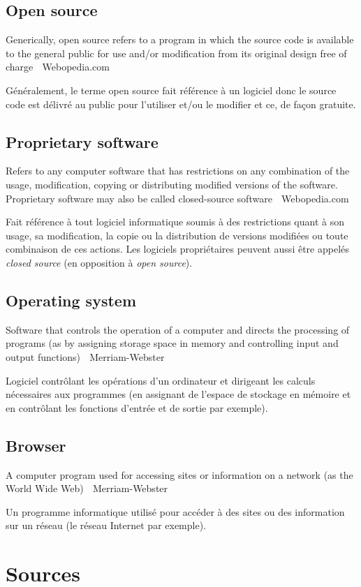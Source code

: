 \documentclass[12pt]{article}
\begin{document}
\subsection*{Open source}

{\color{bg}Generically, open source refers to a program in which the
  source code is available to the general public for use and/or
  modification from its original design free of charge \textemdash
  $\;$ Webopedia.com }

Généralement, le terme open source fait référence à un logiciel donc
le source code est délivré au public pour l'utiliser et/ou le modifier
et ce, de façon gratuite.

\subsection*{Proprietary software}

{\color{bg}Refers to any computer software that has restrictions on
  any combination of the usage, modification, copying or distributing
  modified versions of the software. Proprietary software may also be
  called closed-source software \textemdash $\;$ Webopedia.com }

Fait référence à tout logiciel informatique soumis à des restrictions
quant à son usage, sa modification, la copie ou la distribution de
versions modifiées ou toute combinaison de ces actions. Les logiciels
propriétaires peuvent aussi être appelés \textit{closed source} (en
opposition à \textit{open source}).

\subsection*{Operating system}

{\color{bg}Software that controls the operation of a computer and
  directs the processing of programs (as by assigning storage space in
  memory and controlling input and output functions) \textemdash $\;$
  Merriam-Webster }

Logiciel contrôlant les opérations d'un ordinateur et dirigeant les
calculs nécessaires aux programmes (en assignant de l'espace de
stockage en mémoire et en contrôlant les fonctions d'entrée et de
sortie par exemple).

\subsection*{Browser}

{\color{bg}A computer program used for accessing sites or information
  on a network (as the World Wide Web) \textemdash $\;$
  Merriam-Webster }

Un programme informatique utilisé pour accéder à des sites ou des
information sur un réseau (le réseau Internet par exemple).

\section*{Sources}



\end{document}
